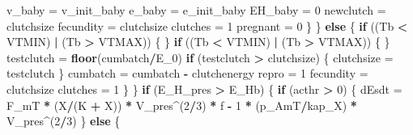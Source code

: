 \documentclass[]{article}
\newenvironment{Shaded}{\begin{snugshade}}{\end{snugshade}}
\newcommand{\KeywordTok}[1]{\textcolor[rgb]{0.13,0.29,0.53}{\textbf{#1}}}
\newcommand{\DecValTok}[1]{\textcolor[rgb]{0.00,0.00,0.81}{#1}}
\newcommand{\StringTok}[1]{\textcolor[rgb]{0.31,0.60,0.02}{#1}}
\newcommand{\ControlFlowTok}[1]{\textcolor[rgb]{0.13,0.29,0.53}{\textbf{#1}}}
\newcommand{\OperatorTok}[1]{\textcolor[rgb]{0.81,0.36,0.00}{\textbf{#1}}}
\newcommand{\NormalTok}[1]{#1}
\begin{document}
\begin{Shaded}
\begin{Highlighting}[]
{{{\NormalTok{                v_baby =}\StringTok{ }\NormalTok{v_init_baby}
\NormalTok{                e_baby =}\StringTok{ }\NormalTok{e_init_baby}
\NormalTok{                EH_baby =}\StringTok{ }\DecValTok{0}
\NormalTok{                newclutch =}\StringTok{ }\NormalTok{clutchsize}
\NormalTok{                fecundity =}\StringTok{ }\NormalTok{clutchsize}
\NormalTok{                clutches =}\StringTok{ }\DecValTok{1}
\NormalTok{                pregnant =}\StringTok{ }\DecValTok{0}
\NormalTok{            \}}
\NormalTok{        \}}
        \ControlFlowTok{else}\NormalTok{ \{}
            \ControlFlowTok{if}\NormalTok{ ((Tb }\OperatorTok{<}\StringTok{ }\NormalTok{VTMIN) }\OperatorTok{|}\StringTok{ }\NormalTok{(Tb }\OperatorTok{>}\StringTok{ }\NormalTok{VTMAX)) \{}
\NormalTok{            \}}
            \ControlFlowTok{if}\NormalTok{ ((Tb }\OperatorTok{<}\StringTok{ }\NormalTok{VTMIN) }\OperatorTok{|}\StringTok{ }\NormalTok{(Tb }\OperatorTok{>}\StringTok{ }\NormalTok{VTMAX)) \{}
\NormalTok{            \}}
\NormalTok{            testclutch =}\StringTok{ }\KeywordTok{floor}\NormalTok{(cumbatch}\OperatorTok{/}\NormalTok{E_}\DecValTok{0}\NormalTok{)}
            \ControlFlowTok{if}\NormalTok{ (testclutch }\OperatorTok{>}\StringTok{ }\NormalTok{clutchsize) \{}
\NormalTok{                clutchsize =}\StringTok{ }\NormalTok{testclutch}
\NormalTok{            \}}
\NormalTok{            cumbatch =}\StringTok{ }\NormalTok{cumbatch }\OperatorTok{-}\StringTok{ }\NormalTok{clutchenergy}
\NormalTok{            repro =}\StringTok{ }\DecValTok{1}
\NormalTok{            fecundity =}\StringTok{ }\NormalTok{clutchsize}
\NormalTok{            clutches =}\StringTok{ }\DecValTok{1}
\NormalTok{        \}}
\NormalTok{    \}}
    \ControlFlowTok{if}\NormalTok{ (E_H_pres }\OperatorTok{>}\StringTok{ }\NormalTok{E_Hb) \{}
        \ControlFlowTok{if}\NormalTok{ (acthr }\OperatorTok{>}\StringTok{ }\DecValTok{0}\NormalTok{) \{}
\NormalTok{            dEsdt =}\StringTok{ }\NormalTok{F_mT }\OperatorTok{*}\StringTok{ }\NormalTok{(X}\OperatorTok{/}\NormalTok{(K }\OperatorTok{+}\StringTok{ }\NormalTok{X)) }\OperatorTok{*}\StringTok{ }\NormalTok{V_pres}\OperatorTok{^}\NormalTok{(}\DecValTok{2}\OperatorTok{/}\DecValTok{3}\NormalTok{) }\OperatorTok{*}\StringTok{ }\NormalTok{f }\OperatorTok{-}\StringTok{ }\DecValTok{1} \OperatorTok{*}\StringTok{ }
\StringTok{                }\NormalTok{(p_AmT}\OperatorTok{/}\NormalTok{kap_X) }\OperatorTok{*}\StringTok{ }\NormalTok{V_pres}\OperatorTok{^}\NormalTok{(}\DecValTok{2}\OperatorTok{/}\DecValTok{3}\NormalTok{)}
\NormalTok{        \}}
        \ControlFlowTok{else}\NormalTok{ \{}
}}}
\end{Highlighting}
\end{Shaded}
\end{document}
